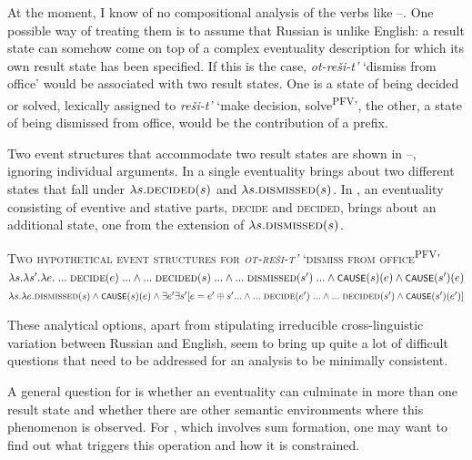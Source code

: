 \documentclass[output=paper,colorlinks,citecolor=brown]{langscibook}
\begin{document}
At the moment, I know of no compositional analysis of the verbs like --. One possible way of treating them is to assume that Russian is unlike English: a result state can somehow come on top of a complex eventuality description for which its own result state has been specified. If this is the case, \textit{ot-reši-t’} ‘dismiss from office’ would be associated with two result states. One is a state of being decided or solved, lexically assigned to \textit{reši-t’} ‘make decision, solve\textsuperscript{PFV}’, the other, a state of being dismissed from office, would be the contribution of a prefix.

Two event structures that accommodate two result states are shown in --, ignoring individual arguments. In  a single eventuality brings about two different states that fall under $\lambda s.\textsc{decided}(s)$ and $\lambda s.\textsc{dismissed}(s)$. In , an eventuality consisting of eventive and stative parts, \textsc{decide} and \textsc{decided}, brings about an additional state, one from the extension of $\lambda s.\textsc{dismissed}(s)$.

\ea   \textsc{Two hypothetical event structures for \textit{ot-reši-t’} ‘dismiss from office\textsuperscript{PFV}’}\label{ex:tatevosov:53}
\ea $\lambda s.\lambda s'.\lambda e.\; ...\; \textsc{decide}(e)\; ... \wedge ...\; \textsc{decided}(s)\; ... \wedge ...\; \textsc{dismissed}(s')\; ... \newline \wedge \cnst{cause}(s)(e) \wedge \cnst{cause}(s')(e)$\label{ex:tatevosov:53a}
\ex    $\lambda s.\lambda e. \textsc{dismissed}(s) \wedge \cnst{cause}(s)(e) \wedge  \exists e' \exists s' [ e = e' \oplus s' ... \newline \wedge ...\; \textsc{decide}(e')\; ... \wedge ...\; \textsc{decided}(s') \wedge \cnst{cause}(s')(e')]$\label{ex:tatevosov:53b}
\z
\z

\noindent These analytical options, apart from stipulating irreducible cross-linguistic variation between Russian and English, seem to bring up quite a lot of difficult questions that need to be addressed for an analysis to be minimally consistent. 

A general question for  is whether an eventuality can culminate in more than one result state and whether there are other semantic environments where this phenomenon  is observed. For , which involves sum formation, one may want to find out what triggers this operation and how it is constrained.
\end{document}

